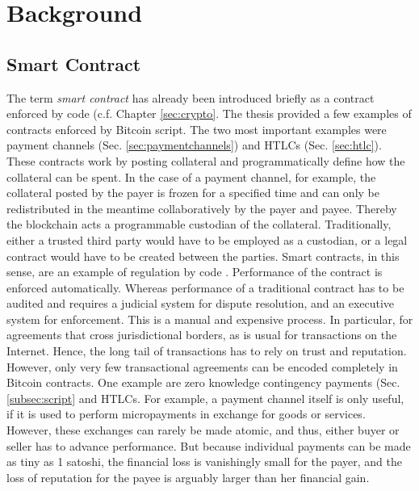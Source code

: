 

\section{Background}


\subsection{Smart Contract}

The term \emph{smart contract} has already been introduced briefly as a contract enforced by code (c.f. Chapter \ref{sec:crypto}. The thesis provided a few examples of contracts enforced by Bitcoin script. The two most important examples were payment channels (Sec. \ref{sec:paymentchannels}) and \ac{HTLC}s (Sec. \ref{sec:htlc}). These contracts work by posting collateral and programmatically define how the collateral can be spent. In the case of a payment channel, for example, the collateral posted by the payer is frozen for a specified time and can only be redistributed in the meantime collaboratively by the payer and payee. Thereby the blockchain acts a programmable custodian of the collateral. Traditionally, either a trusted third party would have to be employed as a custodian, or a legal contract would have to be created between the parties. Smart contracts, in this sense, are an example of regulation by code \parencite{lessig2009code}. Performance of the contract is enforced automatically. Whereas performance of a traditional contract has to be audited and requires a judicial system for dispute resolution, and an executive system for enforcement. This is a manual and expensive process. In particular, for agreements that cross jurisdictional borders, as is usual for transactions on the Internet. Hence, the long tail of transactions has to rely on trust and reputation. However, only very few transactional agreements can be encoded completely in Bitcoin contracts. One example are zero knowledge contingency payments (Sec. \ref{subsec:script} and \ac{HTLC}s. For example, a payment channel itself is only useful, if it is used to perform micropayments in exchange for goods or services. However, these exchanges can rarely be made atomic, and thus, either buyer or seller has to advance performance. But because individual payments can be made as tiny as 1 satoshi, the financial loss is vanishingly small for the payer, and the loss of reputation for the payee is arguably larger than her financial gain. 
